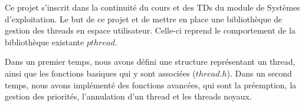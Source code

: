 Ce projet s'inscrit dans la continuité du cours et des TDs du module de
Systèmes d'exploitation. Le but de ce projet et de mettre en place une
bibliothèque de gestion des threads en espace utilisateur. Celle-ci reprend le
comportement de la bibliothèque existante $pthread$.

Dans un premier temps, nous avons défini une structure représentant un
thread, ainsi que les fonctions basiques qui y sont associées ($thread.h$).
Dans un second temps, nous avons implémenté des fonctions avancées, qui sont la préemption, la gestion des priorités, l'annulation d'un thread et les threads noyaux. 

